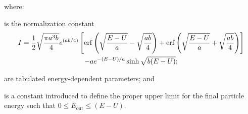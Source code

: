 where:
\begin{description}[font=\textnormal]
  \item[$I$] is the normalization constant
    \begin{multline}
      I = \frac{1}{2}\sqrt{\frac{\pi a^{3}b}{4}}e^{(ab/4)} \left[ \operatorname{erf}\left( \sqrt{\frac{E-U}{a}} - \sqrt{\frac{ab}{4}} \right) + \operatorname{erf}\left( \sqrt{\frac{E-U}{a}} + \sqrt{\frac{ab}{4}} \right) \right] \\
      - a e^{-(E-U)/a} \sinh \sqrt{b(E-U)};
      \label{eq:LAW11I}
    \end{multline}
  \item[$a$ and $b$] are tabulated energy-dependent parameters; and
  \item[$U$] is a constant introduced to define the proper upper limit for the final particle energy such that $0\leq E_{\mathrm{out}} \leq (E-U)$.
\end{description}

